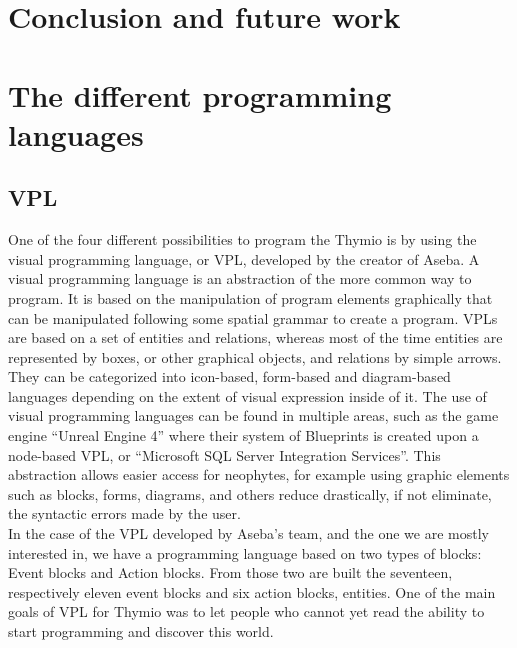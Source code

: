 \documentclass{scrbook}
\begin{document}
\chapter{Conclusion and future work}

\appendix

\chapter{The different programming languages \label{fourlanguages}} 
\section{VPL}

One of the four different possibilities to program the Thymio is by using the visual programming language, or VPL, 
developed by the creator of Aseba. A visual programming language is an abstraction of the more common way to program. 
It is based on the manipulation of program elements graphically that can be manipulated following some spatial grammar to create a program. 
VPLs are based on a set of entities and relations, whereas most of the time entities are represented by boxes, 
or other graphical objects, and relations by simple arrows. They can be categorized into icon-based, 
form-based and diagram-based languages depending on the extent of visual expression inside of it. 
The use of visual programming languages can be found in multiple areas, such as the game engine “Unreal Engine 4” where their system of Blueprints is created upon a node-based VPL, 
or “Microsoft SQL Server Integration Services”. This abstraction allows easier access for neophytes, 
for example using graphic elements such as blocks, forms, diagrams, and others reduce drastically, if not eliminate, the syntactic errors made by the user.\\

In the case of the VPL developed by Aseba’s team, and the one we are mostly interested in, we have a programming language based on two types of blocks: Event blocks and Action blocks. 
From those two are built the seventeen, respectively eleven event blocks and six action blocks, entities. 
One of the main goals of VPL for Thymio was to let people who cannot yet read the ability to start programming and discover this world.\\
\end{document}
